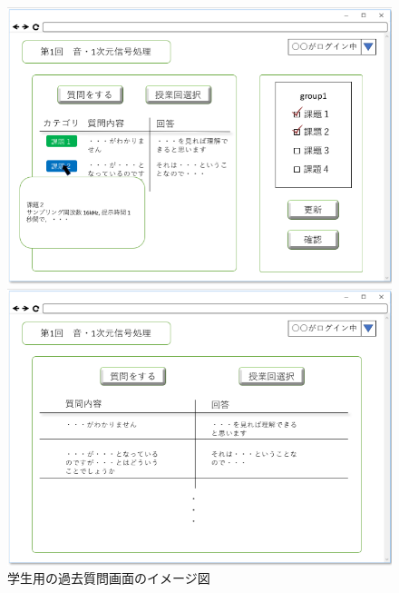\begin{figure}[htbp]
 \begin{minipage}{0.5\hsize}
  \begin{center}
   \includegraphics[width=1\linewidth,clip]{./img/34.png}
  \end{center}

 \end{minipage}
 \begin{minipage}{0.5\hsize}
  \begin{center}
   \includegraphics[width=1\linewidth,clip]{./img/35.png}
  \end{center}
 \end{minipage}
 \caption{学生用の過去質問画面のイメージ図}\label{fig:34}
\end{figure}

